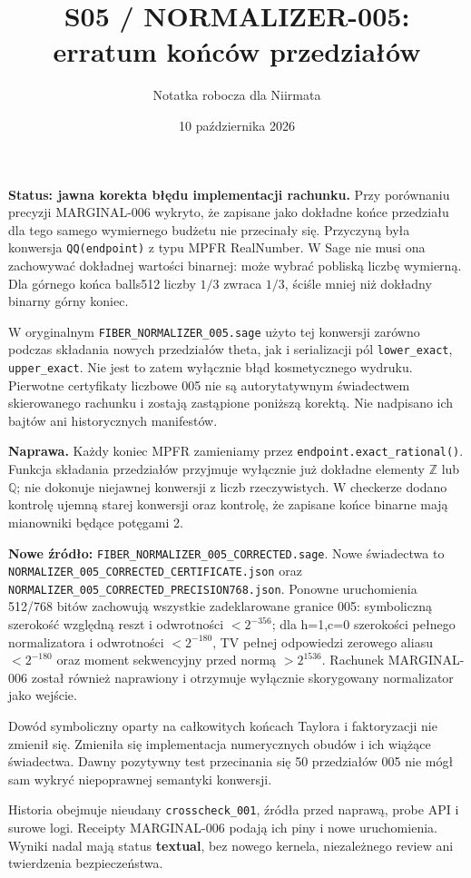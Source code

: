 \documentclass[11pt,a4paper]{article}
\title{S05 / NORMALIZER-005: erratum końców przedziałów}
\author{Notatka robocza dla Niirmata}\date{10 października 2026}
\newcommand{\code}[1]{\nolinkurl{#1}}
\begin{document}
\maketitle
\textbf{Status: jawna korekta błędu implementacji rachunku.}
Przy porównaniu precyzji MARGINAL-006 wykryto, że zapisane jako dokładne
końce przedziału dla tego samego wymiernego budżetu nie przecinały się.
Przyczyną była konwersja \code{QQ(endpoint)} z typu MPFR RealNumber.
W Sage nie musi ona zachowywać dokładnej wartości binarnej: może wybrać
pobliską liczbę wymierną. Dla górnego końca balls512 liczby $1/3$
zwraca $1/3$, ściśle mniej niż dokładny binarny górny koniec.

W oryginalnym \code{FIBER_NORMALIZER_005.sage} użyto tej konwersji
zarówno podczas składania nowych przedziałów theta, jak i serializacji
pól \code{lower_exact}, \code{upper_exact}. Nie jest to zatem wyłącznie
błąd kosmetycznego wydruku. Pierwotne certyfikaty liczbowe 005 nie są
autorytatywnym świadectwem skierowanego rachunku i zostają zastąpione
poniższą korektą. Nie nadpisano ich bajtów ani historycznych manifestów.

\textbf{Naprawa.} Każdy koniec MPFR zamieniamy przez
\code{endpoint.exact_rational()}. Funkcja składania przedziałów przyjmuje
wyłącznie już dokładne elementy $\mathbb Z$ lub $\mathbb Q$;
nie dokonuje niejawnej konwersji z liczb rzeczywistych.
W checkerze dodano kontrolę ujemną starej konwersji oraz kontrolę,
że zapisane końce binarne mają mianowniki będące potęgami 2.

\textbf{Nowe źródło:} \code{FIBER_NORMALIZER_005_CORRECTED.sage}.
Nowe świadectwa to \code{NORMALIZER_005_CORRECTED_CERTIFICATE.json}
oraz \code{NORMALIZER_005_CORRECTED_PRECISION768.json}.
Ponowne uruchomienia 512/768 bitów zachowują wszystkie zadeklarowane
granice 005: symboliczną szerokość względną reszt i odwrotności
$<2^{-356}$; dla h=1,c=0 szerokości pełnego normalizatora i odwrotności
$<2^{-180}$, TV pełnej odpowiedzi zerowego aliasu $<2^{-180}$ oraz
moment sekwencyjny przed normą $>2^{1536}$.
Rachunek MARGINAL-006 został również naprawiony i otrzymuje wyłącznie
skorygowany normalizator jako wejście.

Dowód symboliczny oparty na całkowitych końcach Taylora i faktoryzacji
nie zmienił się. Zmieniła się implementacja numerycznych obudów i ich
wiążące świadectwa. Dawny pozytywny test przecinania się 50 przedziałów
005 nie mógł sam wykryć niepoprawnej semantyki konwersji.

Historia obejmuje nieudany \code{crosscheck_001}, źródła przed naprawą,
probe API i surowe logi. Receipty MARGINAL-006 podają ich piny i nowe
uruchomienia. Wyniki nadal mają status \textbf{textual}, bez nowego kernela,
niezależnego review ani twierdzenia bezpieczeństwa.
\end{document}

